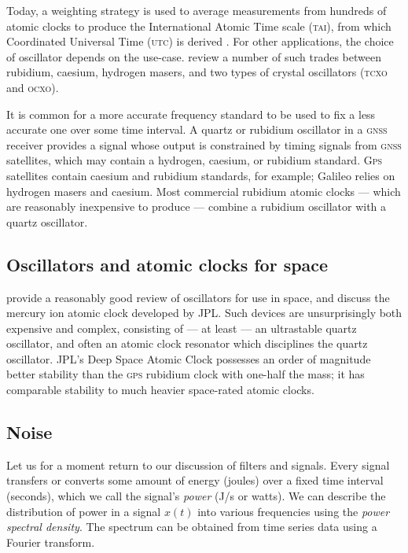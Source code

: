\documentclass[12pt]{article}
\begin{document}
Today, a weighting strategy is used to average measurements from hundreds of atomic clocks to produce the International Atomic Time scale (\textsc{tai}), from which Coordinated Universal Time (\textsc{utc}) is derived \citep{BIPM2018}. For other applications, the choice of oscillator depends on the use-case. \citet{Stein1991} review a number of such trades between rubidium, caesium, hydrogen masers, and two types of crystal oscillators (\textsc{tcxo} and \textsc{ocxo}).

It is common for a more accurate frequency standard to be used to fix a less accurate one over some time interval. A quartz or rubidium oscillator in a \textsc{gnss} receiver provides a signal whose output is constrained by timing signals from \textsc{gnss} satellites, which may contain a hydrogen, caesium, or rubidium standard. \textsc{Gps} satellites contain caesium and rubidium standards, for example; Galileo relies on hydrogen masers and caesium. Most commercial rubidium atomic clocks --- which are reasonably inexpensive to produce --- combine a rubidium oscillator with a quartz oscillator.

\subsection{Oscillators and atomic clocks for space}
\citet{Prestage2007} provide a reasonably good review of oscillators for use in space, and discuss the mercury ion atomic clock developed by JPL. Such devices are unsurprisingly both expensive and complex, consisting of --- at least --- an ultrastable quartz oscillator, and often an atomic clock resonator which disciplines the quartz oscillator. JPL's Deep Space Atomic Clock possesses an order of magnitude better stability than the \textsc{gps} rubidium clock with one-half the mass; it has comparable stability to much heavier space-rated atomic clocks.

\subsection{Noise}
Let us for a moment return to our discussion of filters and signals. Every signal transfers or converts some amount of energy (joules) over a fixed time interval (seconds), which we call the signal's \textit{power} (J/s or watts). We can describe the distribution of power in a signal $x(t)$ into various frequencies using the \textit{power spectral density}. The spectrum can be obtained from time series data using a Fourier transform.
\end{document}
